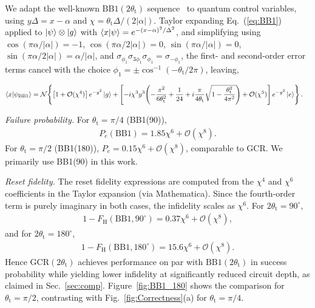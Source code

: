 \documentclass[aps,prx,showpacs,notitlepage,twocolumn,superscriptaddress,nofootinbib,preprintnumbers,floatfix,10pt, longbibliography]{revtex4-2}
\begin{document}
{We adapt the well-known $\mathrm{BB1}(2\theta_\mathrm{t})$ sequence~\cite{wimperis1994broadband} to quantum control variables, using $y\Delta=x-\alpha$ and $\chi=\theta_\mathrm{t}\Delta/(2|\alpha|)$. Taylor expanding Eq.~(\ref{eq:BB1}) applied to $\ket{\psi}\otimes\ket{g}$ with $\braket{x|\psi}=e^{-(x-\alpha)^2/\Delta^2}$, and simplifying using $\cos(\pi\alpha/|\alpha|)=-1$, $\cos(\pi\alpha/2|\alpha|)=0$, $\sin(\pi\alpha/|\alpha|)=0$, $\sin(\pi\alpha/2|\alpha|)=\alpha/|\alpha|$, and $\sigma_{\phi_1}\sigma_{3\phi_1}\sigma_{\phi_1}=\sigma_{-\phi_1}$, the first- and second-order error terms cancel with the choice $\phi_1=\pm\cos^{-1}(-\theta_\mathrm{t}/2\pi)$, leaving,
\begin{widetext}
\begin{align}
\braket{x|\psi_\mathrm{BB1}}
&= \mathcal{N}\!\left\{
   \left[1+\mathcal{O}(\chi^4)\right]e^{-y^2}\ket{g}
   +\left[-i\chi^3 y^3\!\left(-\frac{\pi^2}{6\theta_\mathrm{t}^2}+\frac{1}{24}
          +i\frac{\pi}{4\theta_\mathrm{t}}\sqrt{1-\frac{\theta_\mathrm{t}^2}{4\pi^2}}
          \right)+\mathcal{O}(\chi^5)\right]e^{-y^2}\ket{e}
   \right\}. \label{eq:BB1_simplified}
\end{align}
\end{widetext}

\noindent\textit{Failure probability.} For $\theta_\mathrm{t}=\pi/4$ (BB1(90)),
\begin{align}
P_e(\mathrm{BB1}) = 1.85\chi^6+\mathcal{O}(\chi^8). \label{eq:pe_bb1_90}
\end{align}
For $\theta_\mathrm{t}=\pi/2$ (BB1(180)), $P_e=0.15\chi^6+\mathcal{O}(\chi^8)$, comparable to GCR. We primarily use BB1(90) in this work.

\medskip\noindent\textit{Reset fidelity.}
The reset fidelity expressions are computed from the $\chi^4$ and $\chi^6$ coefficients in the Taylor expansion (via Mathematica). Since the fourth-order term is purely imaginary in both cases, the infidelity scales as $\chi^6$. For $2\theta_\mathrm{t}=90^\circ$,
\begin{align}
1-F_\mathrm{H}(\mathrm{BB1},90^\circ) = 0.37\chi^6+\mathcal{O}(\chi^8),
\end{align}
and for $2\theta_\mathrm{t}=180^\circ$,
\begin{align}
1-F_\mathrm{H}(\mathrm{BB1},180^\circ) = 15.6\chi^6+\mathcal{O}(\chi^8).
\end{align}
Hence $\mathrm{GCR}(2\theta_\mathrm{t})$ achieves performance on par with $\mathrm{BB1}(2\theta_\mathrm{t})$ in success probability while yielding lower infidelity at significantly reduced circuit depth, as claimed in Sec.~\ref{sec:comp}. Figure~\ref{fig:BB1_180} shows the comparison for $\theta_\mathrm{t}=\pi/2$, contrasting with Fig.~\ref{fig:Correctness}(a) for $\theta_\mathrm{t}=\pi/4$.

}
\end{document}
